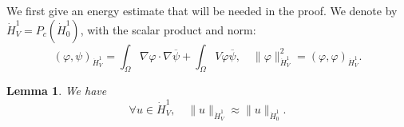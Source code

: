 \documentclass[10pt,leqno]{amsart}
\newtheorem{lemma}[theorem]{Lemma}
\theoremstyle{definition}%
\theoremstyle{remark}
\numberwithin{equation}{section}
\renewcommand{\^}{\widehat}%
\begin{document}
We first give an energy estimate that will be needed in the proof. We denote by $\dot{H}^1_V=P_c(\dot{H}^1_0)$, with the scalar product and norm:
\begin{equation*}
\left(\varphi,\psi\right)_{\dot{H}^1_V}=\int_{\Omega} \nabla \varphi\cdot \nabla \overline{\psi}+\int_{\Omega} V \varphi\overline{\psi},\quad \|\varphi\|^2_{\dot{H}^1_V}=(\varphi,\varphi)_{\dot{H}^1_V}.
\end{equation*} 
\begin{lemma}
	\label{lem:equiv_norm}
	We have 
	\begin{equation}
	\label{eq:equi-en}
	\forall u\in \dot{H}_V^1,\quad \|u\|_{\dot{H}^1_V}\approx \|u\|_{\dot{H}^1_0}.
	\end{equation} 
\end{lemma}
\end{document}
